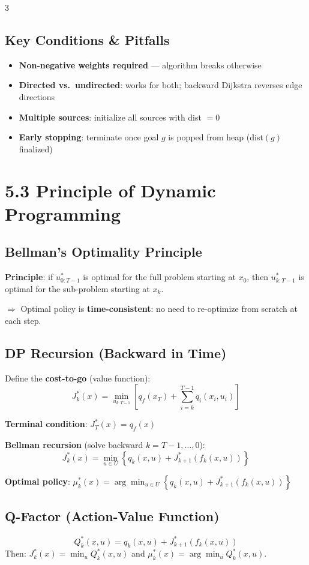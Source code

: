 \documentclass[9pt,landscape]{article}
\begin{document}
\begin{multicols}{3}
\subsection{Key Conditions \& Pitfalls}
\begin{itemize}
  \item \textbf{Non-negative weights required} --- algorithm breaks otherwise
  \item \textbf{Directed vs.\ undirected}: works for both; backward Dijkstra reverses edge directions
  \item \textbf{Multiple sources}: initialize all sources with dist $=0$
  \item \textbf{Early stopping}: terminate once goal $g$ is popped from heap (dist$(g)$ finalized)
\end{itemize}

\section{5.3 Principle of Dynamic Programming}

\subsection{Bellman's Optimality Principle}
\textbf{Principle}: if $u^*_{0:T-1}$ is optimal for the full problem starting at $x_0$, then $u^*_{k:T-1}$ is optimal for the sub-problem starting at $x_k$.

$\Rightarrow$ Optimal policy is \textbf{time-consistent}: no need to re-optimize from scratch at each step.

\subsection{DP Recursion (Backward in Time)}
Define the \textbf{cost-to-go} (value function):
\[J_k^*(x) = \min_{u_{k:T-1}} \left[ q_f(x_T) + \sum_{i=k}^{T-1} q_i(x_i, u_i) \right]\]

\textbf{Terminal condition}: $J_T^*(x) = q_f(x)$

\textbf{Bellman recursion} (solve backward $k = T{-}1, \ldots, 0$):
\[\boxed{J_k^*(x) = \min_{u \in U} \left\{ q_k(x, u) + J_{k+1}^*(f_k(x, u)) \right\}}\]

\textbf{Optimal policy}: $\mu_k^*(x) = \arg\min_{u \in U} \left\{ q_k(x, u) + J_{k+1}^*(f_k(x,u)) \right\}$

\subsection{Q-Factor (Action-Value Function)}
\[Q_k^*(x, u) = q_k(x, u) + J_{k+1}^*(f_k(x, u))\]
Then: $J_k^*(x) = \min_u Q_k^*(x, u)$ and $\mu_k^*(x) = \arg\min_u Q_k^*(x, u)$.


\end{multicols}
\end{document}

